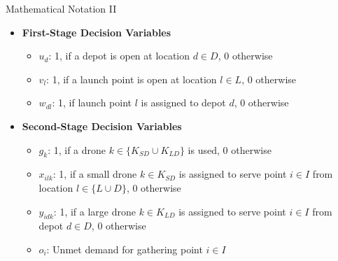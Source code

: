 \documentclass[aspectratio=169]{beamer}
\begin{document}
\begin{frame}{Mathematical Notation II}
    \begin{itemize}
        \item \textbf{First-Stage Decision Variables}
        \begin{itemize}
            \item $u_d$: 1, if a depot is open at location $d \in D$, 0 otherwise
            \item $v_l$: 1, if a launch point is open at location $l \in L$, 0 otherwise
            \item $w_{dl}$: 1, if launch point $l$ is assigned to depot $d$, 0 otherwise
        \end{itemize}
        \item \textbf{Second-Stage Decision Variables}
        \begin{itemize}
            \item $g_k$: 1, if a drone $k \in \{K_{SD} \cup K_{LD}\}$ is used, 0 otherwise
            \item $x_{ilk}$: 1, if a small drone $k \in K_{SD}$ is assigned to serve point $i \in I$ from location $l \in \{L \cup D\}$, 0 otherwise
            \item $y_{idk}$: 1, if a large drone $k \in K_{LD}$ is assigned to serve point $i \in I$ from depot $d \in D$, 0 otherwise
            \item $o_i$: Unmet demand for gathering point $i \in I$
        \end{itemize}
    \end{itemize}
\end{frame}
\end{document}
